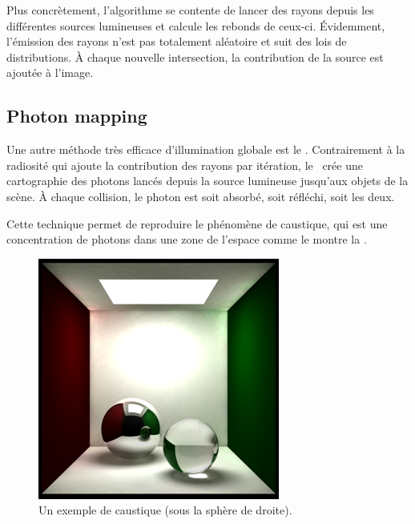 Plus concrètement, l'algorithme se contente de lancer des rayons depuis les
différentes sources lumineuses et calcule les rebonds de ceux-ci. Évidemment,
l'émission des rayons n'est pas totalement aléatoire et suit des lois de
distributions. À chaque nouvelle intersection, la contribution de la source
est ajoutée à l'image. 


\subsection{Photon mapping}
Une autre méthode très efficace d'illumination globale est le . Contrairement à la radiosité qui ajoute la contribution des rayons
par itération, le \ crée une cartographie des photons
lancés depuis la source lumineuse jusqu'aux objets de la scène. À chaque
collision, le photon est soit absorbé, soit réfléchi, soit les deux.

Cette technique permet de reproduire le phénomène de caustique, qui est une
concentration de photons dans une zone de l'espace comme le montre la
.

\begin{figure}
\begin{center}
  \includegraphics[width=.8\textwidth]{img/caustic}
  \caption{Un exemple de caustique (sous la sphère de
  droite).\label{fig:caustic}}
\end{center}
\end{figure}

